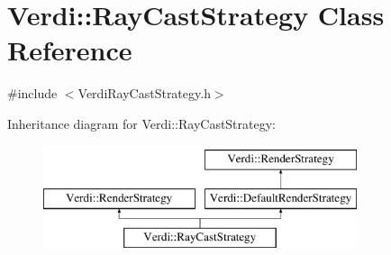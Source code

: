 \hypertarget{class_verdi_1_1_ray_cast_strategy}{\section{\-Verdi\-:\-:\-Ray\-Cast\-Strategy \-Class \-Reference}
\label{class_verdi_1_1_ray_cast_strategy}
}


{\ttfamily \#include $<$\-Verdi\-Ray\-Cast\-Strategy.\-h$>$}

\-Inheritance diagram for \-Verdi\-:\-:\-Ray\-Cast\-Strategy\-:\begin{figure}[H]
\begin{center}
\leavevmode
\includegraphics[height=3.000000cm]{class_verdi_1_1_ray_cast_strategy}
\end{center}
\end{figure}
